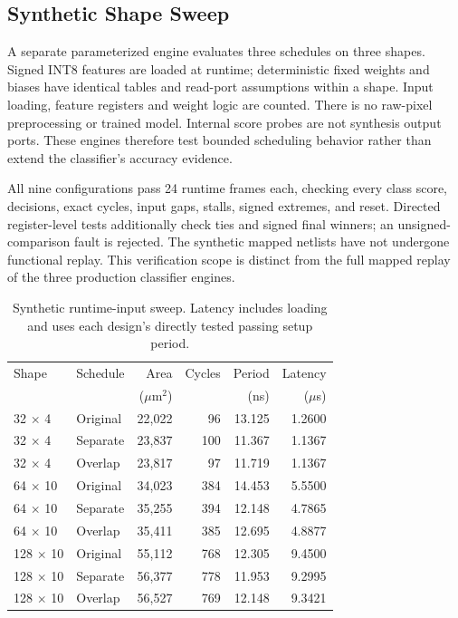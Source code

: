 \subsection{Synthetic Shape Sweep}
A separate parameterized engine evaluates three schedules on three shapes.
Signed INT8 features are loaded at runtime; deterministic fixed weights and
biases have identical tables and read-port assumptions within a shape. Input
loading, feature registers and weight logic are counted. There is no raw-pixel
preprocessing or trained model. Internal score probes are not synthesis output
ports. These engines therefore test bounded scheduling behavior rather than
extend the classifier's accuracy evidence.

All nine configurations pass 24 runtime frames each, checking every class
score, decisions, exact cycles, input gaps, stalls, signed extremes, and reset.
Directed register-level tests additionally check ties and signed final winners;
an unsigned-comparison fault is rejected. The synthetic mapped netlists have
not undergone functional replay. This verification scope is distinct from the
full mapped replay of the three production classifier engines.

\begin{table}[t]
\caption{Synthetic runtime-input sweep. Latency includes loading and uses each design's directly tested passing setup period.}
\label{tab:synthetic}
\centering
\begin{tabular}{@{}llrrrr@{}}
\toprule
Shape & Schedule & Area & Cycles & Period & Latency \\
 & & ($\mu$m$^2$) & & (ns) & ($\mu$s) \\
\midrule
32 $\times$ 4 & Original & 22,022 & 96 & 13.125 & 1.2600 \\
32 $\times$ 4 & Separate & 23,837 & 100 & 11.367 & 1.1367 \\
32 $\times$ 4 & Overlap & 23,817 & 97 & 11.719 & 1.1367 \\
64 $\times$ 10 & Original & 34,023 & 384 & 14.453 & 5.5500 \\
64 $\times$ 10 & Separate & 35,255 & 394 & 12.148 & 4.7865 \\
64 $\times$ 10 & Overlap & 35,411 & 385 & 12.695 & 4.8877 \\
128 $\times$ 10 & Original & 55,112 & 768 & 12.305 & 9.4500 \\
128 $\times$ 10 & Separate & 56,377 & 778 & 11.953 & 9.2995 \\
128 $\times$ 10 & Overlap & 56,527 & 769 & 12.148 & 9.3421 \\
\bottomrule
\end{tabular}
\end{table}

